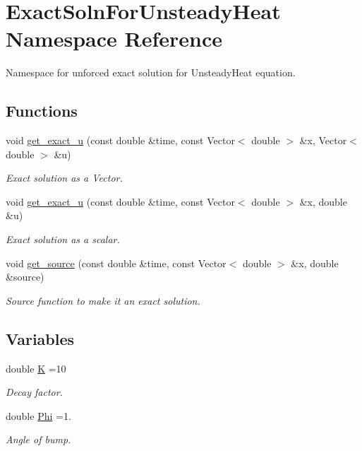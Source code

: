\hypertarget{namespaceExactSolnForUnsteadyHeat}{}\section{Exact\+Soln\+For\+Unsteady\+Heat Namespace Reference}
\label{namespaceExactSolnForUnsteadyHeat}


Namespace for unforced exact solution for Unsteady\+Heat equation.  


\subsection*{Functions}
\begin{DoxyCompactItemize}
\item 
void \hyperlink{namespaceExactSolnForUnsteadyHeat_a1d5b22857bd2a7825397daf1cf9c89eb}{get\+\_\+exact\+\_\+u} (const double \&time, const Vector$<$ double $>$ \&x, Vector$<$ double $>$ \&u)
\begin{DoxyCompactList}\small\item\em Exact solution as a Vector. \end{DoxyCompactList}\item 
void \hyperlink{namespaceExactSolnForUnsteadyHeat_a36e38a9c0c7c0bf8916e2d86ac75b4e2}{get\+\_\+exact\+\_\+u} (const double \&time, const Vector$<$ double $>$ \&x, double \&u)
\begin{DoxyCompactList}\small\item\em Exact solution as a scalar. \end{DoxyCompactList}\item 
void \hyperlink{namespaceExactSolnForUnsteadyHeat_ab4e853d6368b1fcdbd6205079687455a}{get\+\_\+source} (const double \&time, const Vector$<$ double $>$ \&x, double \&source)
\begin{DoxyCompactList}\small\item\em Source function to make it an exact solution. \end{DoxyCompactList}\end{DoxyCompactItemize}
\subsection*{Variables}
\begin{DoxyCompactItemize}
\item 
double \hyperlink{namespaceExactSolnForUnsteadyHeat_a20d04bcf14546becd4bcdf45446be756}{K} =10
\begin{DoxyCompactList}\small\item\em Decay factor. \end{DoxyCompactList}\item 
double \hyperlink{namespaceExactSolnForUnsteadyHeat_a630f9e8d892cfcc41cdaef25bfc87ca1}{Phi} =1.
\begin{DoxyCompactList}\small\item\em Angle of bump. \end{DoxyCompactList}\end{DoxyCompactItemize}


